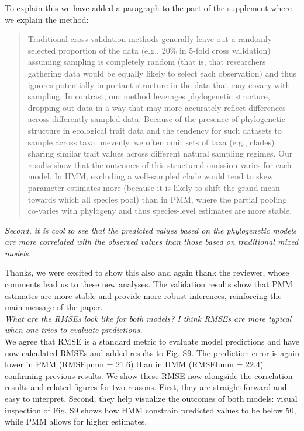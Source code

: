\documentclass[11pt]{article}
\begin{document}
To explain this we have added a paragraph to the part of the supplement where we explain the method:

\begin{quote}
Traditional cross-validation methods generally leave out a randomly selected proportion of the data (e.g., 20\% in 5-fold cross validation) assuming sampling is completely random (that is, that researchers gathering data would be equally likely to select each observation) and thus ignores potentially important structure in the data that may covary with sampling. In contrast, our method leverages phylogenetic structure, dropping out data in a way that may more accurately reflect differences across differently sampled data. Because of the presence of phylogenetic structure in ecological trait data and the tendency for such datasets to sample across taxa unevenly, we often omit sets of taxa (e.g., clades) sharing similar trait values across different natural sampling regimes. Our results show that the outcomes of this structured omission varies for each model. In HMM, excluding a well-sampled clade would tend to skew parameter estimates more (because it is likely to shift the grand mean towards which all species pool) than in PMM, where the partial pooling co-varies with phylogeny and thus species-level estimates are more stable. 
\end{quote} 


\emph{Second, it is cool to see that the predicted values based on the phylogenetic models are more correlated with the observed values than those based on traditional mixed models. }

Thanks, we were excited to show this also and again thank the reviewer, whose comments lead us to these new analyses. The validation results show that PMM estimates are more stable and provide more robust inferences, reinforcing the main message of the paper.\\


\emph{What are the RMSEs look like for both models? I think RMSEs are more typical when one tries to evaluate predictions. }\\

We agree that RMSE is a standard metric to evaluate model predictions and have now calculated RMSEs and added results to Fig. S9. The prediction error is again lower in PMM (RMSEpmm = 21.6) than in HMM (RMSEhmm = 22.4) confirming previous results. We show these RMSE now alongside the correlation results and related figures for two reasons. First, they are straight-forward and easy to interpret. Second, they help visualize the outcomes of both models: visual inspection of Fig. S9 shows how HMM constrain predicted values to be below 50, while PMM allows for higher estimates.\\
\end{document}

